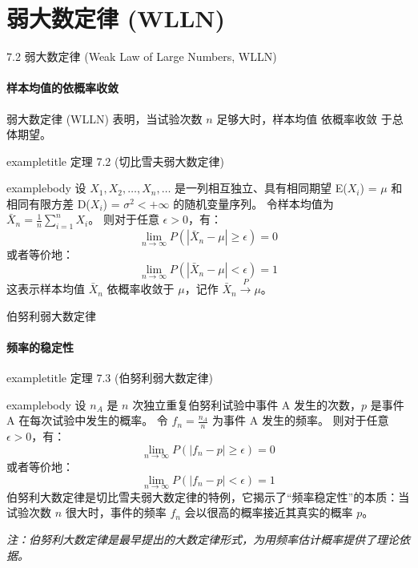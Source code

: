\documentclass[UTF8]{beamer} %
\begin{document}
\section{弱大数定律 (WLLN)}
\begin{frame}[shrink=5]{7.2 弱大数定律 (Weak Law of Large Numbers, WLLN)}
    \framesubtitle{样本均值的依概率收敛}
    弱大数定律 (WLLN) 表明，当试验次数 $n$ 足够大时，样本均值 \alert{依概率收敛} 于总体期望。
    \vspace{0.3cm}

    \begin{beamercolorbox}[sep=0.3cm,center,wd=\textwidth]{exampletitle}
        定理 7.2 (切比雪夫弱大数定律)
    \end{beamercolorbox}
    \begin{beamercolorbox}[sep=0.3cm,wd=\textwidth]{examplebody}
        设 $X_1, X_2, \dots, X_n, \dots$ 是一列\alert{相互独立}、具有相同期望 E($X_i$) = $\mu$ 和相同有限方差 D($X_i$) = $\sigma^2 < +\infty$ 的随机变量序列。
        令样本均值为 $\bar{X}_n = \frac{1}{n} \sum_{i=1}^{n} X_i$。
        则对于任意 $\epsilon > 0$，有：
        \[ \lim_{n \to \infty} P(|\bar{X}_n - \mu| \geq \epsilon) = 0 \]
        或者等价地：
        \[ \lim_{n \to \infty} P(|\bar{X}_n - \mu| < \epsilon) = 1 \]
        这表示样本均值 $\bar{X}_n$ \alert{依概率收敛}于 $\mu$，记作 $\bar{X}_n \xrightarrow{P} \mu$。
    \end{beamercolorbox}
\end{frame}

\begin{frame}[shrink=5]{伯努利弱大数定律}
    \framesubtitle{频率的稳定性}
    \begin{beamercolorbox}[sep=0.3cm,center,wd=\textwidth]{exampletitle}
        定理 7.3 (伯努利弱大数定律)
    \end{beamercolorbox}
    \begin{beamercolorbox}[sep=0.3cm,wd=\textwidth]{examplebody}
        设 $n_A$ 是 $n$ 次独立重复伯努利试验中事件 A 发生的次数，$p$ 是事件 A 在每次试验中发生的概率。
        令 $f_n = \frac{n_A}{n}$ 为事件 A 发生的频率。
        则对于任意 $\epsilon > 0$，有：
        \[ \lim_{n \to \infty} P\left(\left| f_n - p \right| \geq \epsilon\right) = 0 \]
        或者等价地：
        \[ \lim_{n \to \infty} P\left(\left| f_n - p \right| < \epsilon\right) = 1 \]
        伯努利大数定律是切比雪夫弱大数定律的特例，它揭示了“\alert{频率稳定性}”的本质：当试验次数 $n$ 很大时，事件的频率 $f_n$ 会以很高的概率接近其真实的概率 $p$。
    \end{beamercolorbox}
    \vspace{0.3cm}
    \footnotesize
    \textit{注：伯努利大数定律是最早提出的大数定律形式，为用频率估计概率提供了理论依据。}
\end{frame}
\end{document}
